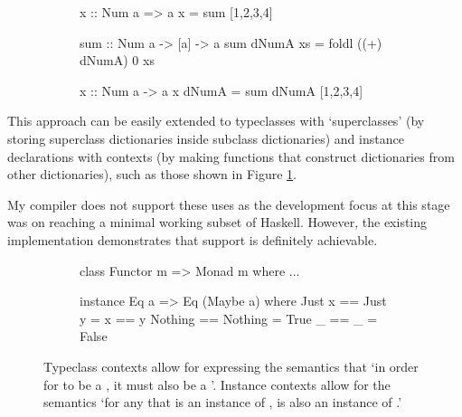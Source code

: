 \documentclass[dissertation.tex]{subfiles}
\begin{document}
{{{\begin{enumerate}
{\begin{figure}[H]
\begin{subfigure}[t]{0.30\textwidth}
\begin{haskellfigure}
                x :: Num a => a
                x = sum [1,2,3,4]
                \end{haskellfigure}
                \end{subfigure}
                \hspace{5mm}
                \begin{subfigure}[t]{0.45\textwidth}
                \begin{haskellfigure}
                sum :: Num a -> [a] -> a
                sum dNumA xs = foldl ((+) dNumA) 0 xs

                x :: Num a -> a
                x dNumA = sum dNumA [1,2,3,4]
                \end{haskellfigure}
                \end{subfigure}
                \end{figure}
            }
            \end{enumerate}

            This approach can be easily extended to typeclasses with `superclasses' (by storing superclass dictionaries inside subclass dictionaries) and instance declarations with contexts (by making functions that construct dictionaries from other dictionaries), such as those shown in Figure \ref{fig:instance-context}. 

            My compiler does not support these uses as the development focus at this stage was on reaching a minimal working subset of Haskell. However, the existing implementation demonstrates that support is definitely achievable.

            \begin{figure}[h]
            \centering
            \begin{subfigure}[t]{0.40\textwidth}
            \begin{haskellfigure}
            class Functor m => Monad m where
                ...
            \end{haskellfigure}
            \end{subfigure}
            \hspace{5mm}
            \begin{subfigure}[t]{0.40\textwidth}
            \begin{haskellfigure}
            instance Eq a => Eq (Maybe a) where
                Just x == Just y = x == y
                Nothing == Nothing = True
                _ == _ = False
            \end{haskellfigure}
            \end{subfigure}
            \caption{Typeclass contexts allow for expressing the semantics that `in order for  to be a , it must also be a '. Instance contexts allow for the semantics `for any  that is an instance of ,  is also an instance of .'}
            \label{fig:instance-context}
            \end{figure}
        }
    }
}
\end{document}
